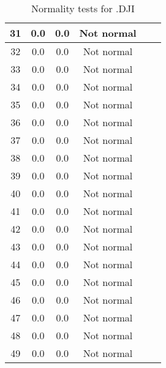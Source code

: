 \begin{table}[h]
\begin{tabular}{|c|c|c|c|c|c|}
		31 & 0.0 & 0.0 & Not normal\\\hline
		32 & 0.0 & 0.0 & Not normal\\\hline
		33 & 0.0 & 0.0 & Not normal\\\hline
		34 & 0.0 & 0.0 & Not normal\\\hline
		35 & 0.0 & 0.0 & Not normal\\\hline
		36 & 0.0 & 0.0 & Not normal\\\hline
		37 & 0.0 & 0.0 & Not normal\\\hline
		38 & 0.0 & 0.0 & Not normal\\\hline
		39 & 0.0 & 0.0 & Not normal\\\hline
		40 & 0.0 & 0.0 & Not normal\\\hline
		41 & 0.0 & 0.0 & Not normal\\\hline
		42 & 0.0 & 0.0 & Not normal\\\hline
		43 & 0.0 & 0.0 & Not normal\\\hline
		44 & 0.0 & 0.0 & Not normal\\\hline
		45 & 0.0 & 0.0 & Not normal\\\hline
		46 & 0.0 & 0.0 & Not normal\\\hline
		47 & 0.0 & 0.0 & Not normal\\\hline
		48 & 0.0 & 0.0 & Not normal\\\hline
		49 & 0.0 & 0.0 & Not normal\\\hline
	\end{tabular}
	\caption{Normality tests for .DJI}
	\label{tab:normality_tests_.DJI_}
\end{table}
